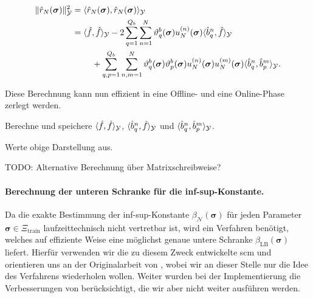 \documentclass[../main.tex]{subfiles}
\begin{document}
\begin{equation}
    \begin{aligned}
        \norm{\hat{r}_{N}(\bm \sigma)}_{\mathcal Y}^{2}
        &= \skp{\hat{r}_{N}(\bm \sigma)}{\hat{r}_{N}(\bm \sigma)}{\mathcal Y}
        \\&= \begin{multlined}[t]
            \skp{\hat{f}}{\hat{f}}{\mathcal Y}
                - 2 \sum_{q = 1}^{Q_b} \sum_{n = 1}^{N} \theta_{q}^{b}(\bm \sigma) u_{N}^{(n)}(\bm \sigma) \skp{\hat{b}^{n}_{q}}{\hat{f}}{\mathcal Y}
                \\+ \sum_{q, p = 1}^{Q_b} \sum_{n, m = 1}^{N} \theta_{q}^{b}(\bm \sigma) \theta_{p}^{b}(\bm \sigma) u_{N}^{(n)}(\bm \sigma) u_{N}^{(m)}(\bm \sigma) \skp{\hat{b}^{n}_{q}}{\hat{b}^{m}_{p}}{\mathcal Y}.
        \end{multlined}
    \end{aligned}
\end{equation}

Diese Berechnung kann nun effizient in eine Offline- und eine Online-Phase zerlegt werden.

\begin{description}[font=\normalfont\itshape]
    \item[Offline:] Berechne und speichere $\langle\hat{f},\hat{f}\rangle_{\mathcal Y}$, $\langle\hat{b}^{n}_{q},\hat{f}\rangle_{\mathcal Y}$ und $\langle\hat{b}^{n}_{q},\hat{b}^{m}_{p}\rangle_{\mathcal Y}$.
    \item[Online:] Werte obige Darstellung aus.
\end{description}

TODO: Alternative Berechnung über Matrixschreibweise?


\paragraph{Berechnung der unteren Schranke für die inf-sup-Konstante.} %
\label{par:berechnung_der_unteren_schranke_f_r_die_inf_sup_konstante_}

Da die exakte Bestimmung der inf-sup-Konstante $\beta_{\mathcal N}(\bm \sigma)$ für jeden Parameter $\bm \sigma \in \Xi_{\mathrm{train}}$ laufzeittechnisch nicht vertretbar ist, wird ein Verfahren benötigt, welches auf effiziente Weise eine möglichst genaue untere Schranke $\beta_{\mathrm{LB}}(\bm \sigma)$ liefert.
Hierfür verwenden wir die zu diesem Zweck entwickelte \ac{scm} und orientieren uns an der Originalarbeit von \textcite{Huynh2007}, wobei wir an dieser Stelle nur die Idee des Verfahrens wiederholen wollen.
Weiter wurden bei der Implementierung die Verbesserungen von \textcite{Chen2009} berücksichtigt, die wir aber nicht weiter ausführen werden.
\end{document}
